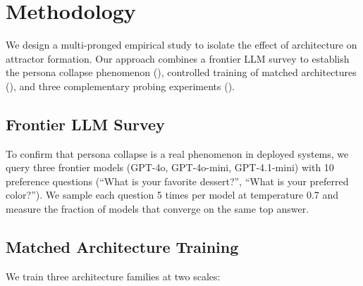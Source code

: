 \section{Methodology}
\label{sec:method}

We design a multi-pronged empirical study to isolate the effect of architecture on attractor formation. Our approach combines a frontier LLM survey to establish the persona collapse phenomenon (), controlled training of matched architectures (), and three complementary probing experiments ().

\subsection{Frontier LLM Survey}
\label{sec:method_survey}

To confirm that persona collapse is a real phenomenon in deployed systems, we query three frontier models (GPT-4o, GPT-4o-mini, GPT-4.1-mini) with 10 preference questions (\eg ``What is your favorite dessert?'', ``What is your preferred color?''). We sample each question 5 times per model at temperature 0.7 and measure the fraction of models that converge on the same top answer.

\subsection{Matched Architecture Training}
\label{sec:method_training}

 We train three architecture families at two scales:

\begin{table}[h]
\centering
\caption{Model configurations. All models share the same tokenizer and training data. The small-scale Transformer and GRU achieve comparable perplexity, enabling controlled comparison.}
\label{tab:models}
\end{table}

